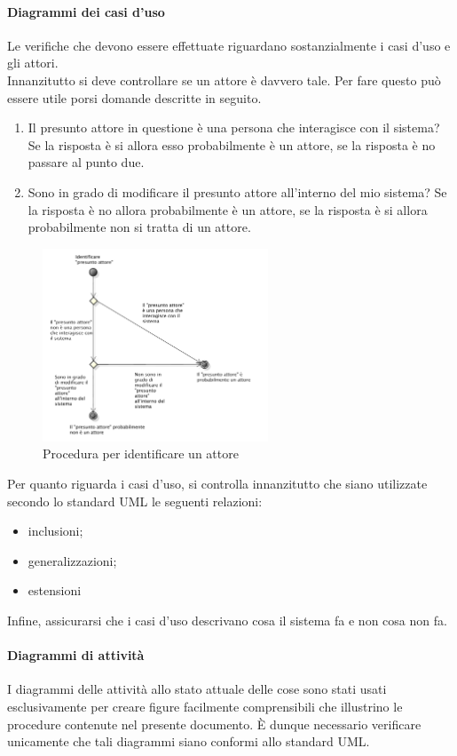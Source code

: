 			\paragraph{Diagrammi dei casi d'uso}
				Le verifiche che devono essere effettuate riguardano sostanzialmente i casi d'uso e gli attori.\\
				Innanzitutto si deve controllare se un attore è davvero tale. Per fare questo può essere utile porsi domande descritte in seguito.
				\begin{enumerate}
					\item Il presunto attore in questione è una persona che interagisce con il sistema? Se la risposta è si allora esso probabilmente 
					è un attore, se la risposta è no passare al punto due.
					\item Sono in grado di modificare il presunto attore all'interno del mio sistema? Se la risposta è no allora probabilmente è un attore, 
					se la risposta è si allora probabilmente non si tratta di un attore.
				\end{enumerate}
				\begin{figure}[H]
					\centering
					\includegraphics[width=0.6\textwidth]{NormeDiProgetto/Pics/VerificaAttori}
					\caption{Procedura per identificare un attore}
				\end{figure}
				Per quanto riguarda i casi d'uso, si controlla innanzitutto che siano utilizzate secondo lo standard UML le seguenti relazioni:
				\begin{itemize}
					\item inclusioni;
					\item generalizzazioni;
					\item estensioni
				\end{itemize}
				Infine, assicurarsi che i casi d'uso descrivano cosa il sistema fa e non cosa non fa.
			\paragraph{Diagrammi di attività}
				I diagrammi delle attività allo stato attuale delle cose sono stati usati esclusivamente per creare figure facilmente 
				comprensibili che illustrino le procedure contenute nel presente documento. È dunque necessario verificare unicamente che tali 
				diagrammi siano conformi allo standard UML.
